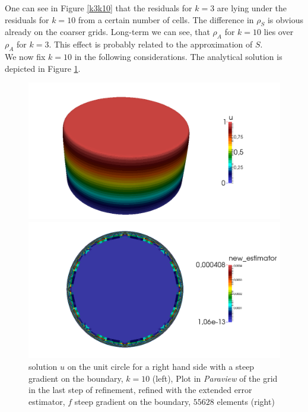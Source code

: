 \documentclass[a4paper, 11pt, twoside]{article}
\begin{document}
One can see in Figure \ref{k3k10} that the residuals for $k=3$ are lying under the residuals for $k=10$ from a certain number of cells. 
The difference in $\rho_S$ is obvious already on the coarser grids. Long-term we can see, that $\rho_A$ for $k=10$ lies over $\rho_A$ for $k=3$.
This effect is probably related to the approximation of $S$.\\
We now fix $k=10$ in the following considerations. The analytical solution is depicted in Figure \ref{f_parabel_circle_est}.
\begin{figure}[htbp!]
\begin{minipage}{0.49\textwidth}
  \includegraphics[width=\textwidth]{fig/f_parabel_u_3D.png}
\end{minipage}
  \hfill
\begin{minipage}{0.49\textwidth}
   \includegraphics[width=\textwidth]{fig/circle_est/circle_parabel_12.png}
\end{minipage}
  \caption{solution $u$ on the unit circle for a right hand side with a steep gradient on the boundary, $k=10$ (left),
  Plot in \textit{Paraview} of the grid in the last step of refinement, refined with the extended error estimator, 
  $f$ steep gradient on the boundary, $55628$ elements (right)}
  \label{f_parabel_circle_est}
 \end{figure}
\end{document}
